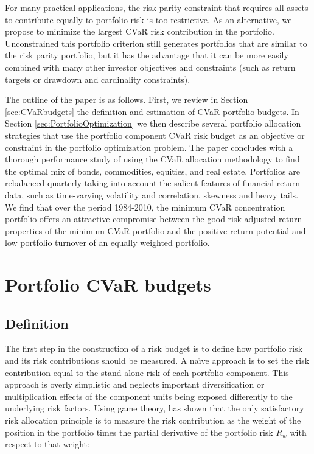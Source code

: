 \documentclass[12pt,a4paper]{article}
\begin{document}
For many practical applications, the risk parity constraint that requires all assets to contribute equally to portfolio risk is too restrictive. As an alternative, we propose to minimize the largest CVaR risk contribution in the portfolio. Unconstrained this portfolio criterion still  generates portfolios that are similar to the risk parity portfolio, but it has the advantage that it can be more easily combined with many other investor objectives and constraints (such as return targets or drawdown and cardinality constraints).

 The outline of the paper is as follows. First, we review in Section \ref{sec:CVaRbudgets} the definition and estimation of CVaR portfolio budgets. In Section \ref{sec:PortfolioOptimization} we then describe several portfolio allocation strategies that use the portfolio component CVaR risk budget as an objective or constraint in the portfolio optimization problem. The paper concludes with a thorough performance study of
 using the CVaR allocation methodology to find the optimal mix of bonds, commodities, equities, and real estate. Portfolios are rebalanced quarterly taking into account the salient features of financial return data, such as time-varying volatility and correlation, skewness and heavy tails. We find that over the period 1984-2010, the minimum CVaR concentration portfolio offers an attractive compromise between the good risk-adjusted return properties of the minimum CVaR portfolio and the positive return potential and low portfolio turnover of an equally weighted portfolio.





\section{Portfolio CVaR budgets \label{sec:CVaRbudgets}}

\subsection{Definition}

The first step in the construction of a risk budget is to define how portfolio risk and its risk contributions should be measured. A na\"{\i}ve approach is to set the risk contribution equal to the stand-alone risk of each portfolio component. This approach is overly simplistic and neglects important diversification or multiplication effects of the component units being exposed differently to the underlying risk factors. Using game theory, \citet{Denault2001} has shown that the only satisfactory risk allocation principle is to measure the risk contribution as the weight of the position in the portfolio times the partial derivative of the portfolio risk  $R_w$ with respect to that weight:
\end{document}
